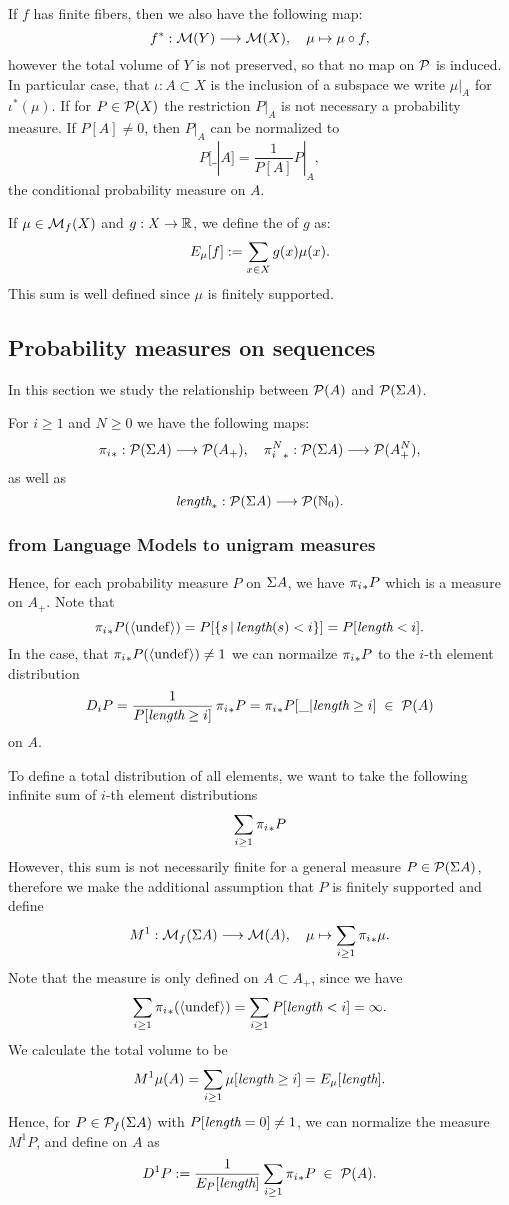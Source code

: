 \documentclass[11pt]{article}
\begin{document}
If $f$ has finite fibers, then we also have the following map:
\[ f^*: \mathcal{M}(Y) \longrightarrow \mathcal{M}(X), \quad \mu \mapsto \mu \circ f, \]
however the total volume of $Y$ is not preserved, so that no map on
$\mathcal{P}$ is induced. In particular case, that $\iota: A \subset X$ is
the inclusion of a subspace we write $\mu|_A$ for $\iota^*(\mu)$.  If
for $P\in \mathcal{P}(X)$ the restriction $P|_{A}$ is not necessary a
probability measure. If $P[A] \neq 0$, then $P|_A$ can be normalized
to \[ P[\_|A]=\frac{1}{P[A]}P|_A,\] the conditional probability
measure on $A$.

If $\mu \in \mathcal{M}_f(X)$ and $g:X \rightarrow {\mathbb R}$, we define the 
of $g$ as:
\[ E_{\mu}[f] :=  \sum_{x \in X} g(x) \mu(x). \]
This sum is well defined since $\mu$ is  finitely supported.

\subsection{Probability measures on sequences}

In this section we study the relationship between $\mathcal{P}(A)$ and
$\mathcal{P}(\Sigma A)$.

For $i \geq 1$ and $N \geq 0$ we have the following maps:
\[ {\pi_{i}}_*: \mathcal{P}(\Sigma A) \longrightarrow \mathcal{P}(A_+), \quad {\pi_{i}^{N}}_*: \mathcal{P}(\Sigma A) \longrightarrow \mathcal{P}(A^N_+), \]
as well as
\[ \text{\it length}_*: \mathcal{P}(\Sigma A) \longrightarrow \mathcal{P}({\mathbb N}_0). \]

\subsubsection{from Language Models to unigram measures}

Hence, for each probability measure $P$ on $\Sigma A$, we have
${\pi_{i}}_* P$ which is a measure on $A_+$. Note that
\[ {\pi_{i}}_* P (\langle \mathrm{undef} \rangle) = P[\{s \,|\, \text{\it length}(s) < i \}] = P[\text{\it length} < i]. \]
In the case, that ${\pi_{i}}_* P (\langle \mathrm{undef} \rangle) \neq 1$ we can normailze
${\pi_{i}}_* P$ to the $i$-th element distribution
\[ D_i P = \frac{1}{P[\text{\it length} \geq i]} \, {\pi_{i}}_* P = {\pi_{i}}_*P[\_|\text{\it length}
\geq i]  \;\in\; \mathcal{P}(A)\]
on $A$.

To define a total distribution of all elements, we want to take the
following infinite sum of $i$-th element distributions
\[ \sum_{i \geq 1} {\pi_{i}}_* P \]
However, this sum is not necessarily finite for a general measure $P
\in \mathcal{P}(\Sigma A)$, therefore we make the additional assumption that $P$
is finitely supported and define
\[ M^1 : \mathcal{M}_f(\Sigma A) \longrightarrow \mathcal{M}(A), \quad \mu \mapsto 
         \sum_{i \geq 1} {\pi_{i}}_* \mu. \]
Note that the measure is only defined on $A \subset A_+$, since
we have
\[ \sum_{i \geq 1} {\pi_{i}}_*(\langle \mathrm{undef} \rangle) = \sum_{i \geq 1} P[\text{\it length} < i] =
\infty. \]
We calculate the total volume to be
\[ M^1 \mu(A) = \sum_{i \geq 1} \mu[\text{\it length} \geq i] = E_{\mu}[\text{\it length}]. \]
Hence, for $P \in \mathcal{P}_f(\Sigma A)$ with $P[\text{\it length} = 0] \neq 1$, we can
normalize the measure $M^1P$, and define  on
$A$ as
\[ D^1 P := \frac{1}{E_{P}[\text{\it length}]} \sum_{i \geq 1} {\pi_{i}}_* P \;\in\;
\mathcal{P}(A). \]
\end{document}

